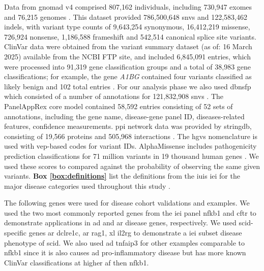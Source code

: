 Data from \ac{gnomad} v4 comprised 807,162 individuals, including 730,947 exomes and 76,215 genomes \cite{karczewski2020mutational}. This dataset provided 786,500,648 \ac{snv}s and 122,583,462 \ac{indel}s, with variant type counts of 9,643,254 synonymous, 16,412,219 missense, 726,924 nonsense, 1,186,588 frameshift and 542,514 canonical splice site variants. ClinVar data were obtained from the variant summary dataset (as of: 16 March 2025) available from the NCBI FTP site, and included 6,845,091 entries, which were processed into 91,319 gene classification groups and a total of 38,983 gene classifications; for example, the gene \textit{A1BG} contained four variants classified as likely benign and 102 total entries \cite{landrum_clinvar_2018}. For our analysis phase we also used \ac{dbnsfp} which consisted of a number of annotations for 121,832,908 \ac{snv}s 
\cite{liu_dbnsfp_2020}. 
The PanelAppRex core model contained 58,592 entries consisting of 52 sets of annotations, including the gene name, disease-gene panel ID, diseases-related features, confidence measurements.
\cite{lawless_panelapprex_2025}
\ac{ppi} network data was provided by \ac{stringdb}, consisting of 19,566 proteins and 505,968 interactions \cite{szklarczyk2025string}.
The \ac{hgvs} nomenclature is used with \ac{vep}-based codes for variant IDs.
AlphaMissense includes pathogenicity prediction classifications for 71 million variants in 19 thousand human genes \cite{cheng_accurate_2023, jun_cheng_2023_8208688}. We used these scores to compared against the probability of observing the same given variants.
\textbf{Box \ref{box:definitions}} list the definitions from the \ac{iuis} \ac{iei} for the major disease categories used throughout this study \cite{poli_human_2025}.

The following genes were used for disease cohort validations and examples.
We used the two most commonly reported genes from the \ac{iei} panel \ac{nfkb1} 
\cite{tuijnenburgNFKB12018,
who1997primary,
cunningham1999common,
oksenhendler2008infections}
and \ac{cftr} 
\cite{naito2023uk, castellani2013cftr2, Grasemann2023cftr}
to demonstrate applications in \ac{ad} and \ac{ar} disease genes, respectively.
We used \ac{scid}-specific genes 
\ac{ar} \ac{dclre1c},
\ac{ar} \ac{rag1},
\ac{xl} \ac{il2rg} to demonstrate a \ac{iei} subset disease phenotype of 
\ac{scid}.
We also used \ac{ad} \ac{tnfaip3} for other examples comparable to \ac{nfkb1} since it is also causes \ac{ad} pro-inflammatory disease but has more known ClinVar classifications at higher \ac{af} then \ac{nfkb1}.


